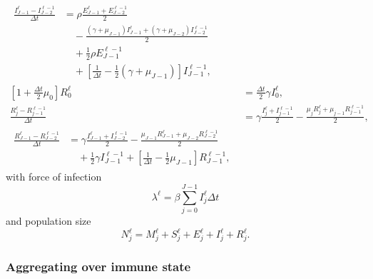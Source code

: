 \documentclass{jpmarticle}
\let\subequationsorig\subequations%
\let\endsubequationsorig\endsubequations%
\renewenvironment{subequations}{
  \subequationsorig
  \renewcommand{\theequation}{\theparentequation.\arabic{equation}}
}{
  \endsubequationsorig
}
\begin{document}
\begin{subequations}
\begin{align}
    \\
    \begin{split}
      \frac{I_{J - 1}^{\ell} - I_{J - 2}^{\ell - 1}}{\Delta t} &=
      \rho \frac{E_{J - 1}^{\ell} + E_{J - 2}^{\ell - 1}}{2}
      \\ & \quad {}
      - \frac{(\gamma + \mu_{J - 1}) I_{J - 1}^{\ell}
        + (\gamma + \mu_{J - 2}) I_{J - 2}^{\ell - 1}}{2}
      \\ & \quad {}
      + \frac{1}{2} \rho E_{J - 1}^{\ell - 1}
      \\ & \quad {}
      + \left[
        \frac{1}{\Delta t} - \frac{1}{2} (\gamma + \mu_{J - 1})
      \right] I_{J - 1}^{\ell - 1},
    \end{split}
    \\
    \left[1 + \frac{\Delta t}{2} \mu_0\right] R_0^{\ell}
    &= \frac{\Delta t}{2} \gamma I_0^{\ell},
    \\
    \frac{R_j^{\ell} - R_{j - 1}^{\ell - 1}}{\Delta t} &=
    \gamma \frac{I_j^{\ell} + I_{j - 1}^{\ell - 1}}{2}
    - \frac{\mu_j R_j^{\ell} + \mu_{j - 1} R_{j - 1}^{\ell - 1}}{2},
    \\
    \begin{split}
      \frac{R_{J - 1}^{\ell} - R_{J - 2}^{\ell - 1}}{\Delta t} &=
      \gamma \frac{I_{J - 1}^{\ell} + I_{J - 2}^{\ell - 1}}{2}
      - \frac{\mu_{J - 1} R_{J - 1}^{\ell}
        + \mu_{J - 2} R_{J - 2}^{\ell - 1}}{2}
      \\ & \quad {}
      + \frac{1}{2}
      \gamma I_{J - 1}^{\ell - 1}
      + \left[
        \frac{1}{\Delta t} - \frac{1}{2} \mu_{J - 1}
      \right] R_{J - 1}^{\ell - 1},
    \end{split}
  \end{align}
  with force of infection
  \begin{equation}
    \lambda^{\ell} =
    \beta \sum_{j = 0}^{J - 1} I_j^{\ell} \Delta t
  \end{equation}
  and population size
  \begin{equation}
    N_j^{\ell} =
    M_j^{\ell} + S_j^{\ell} + E_j^{\ell} + I_j^{\ell} + R_j^{\ell}.
  \end{equation}
\end{subequations}

\subsubsection{Aggregating over immune state}
\end{document}
